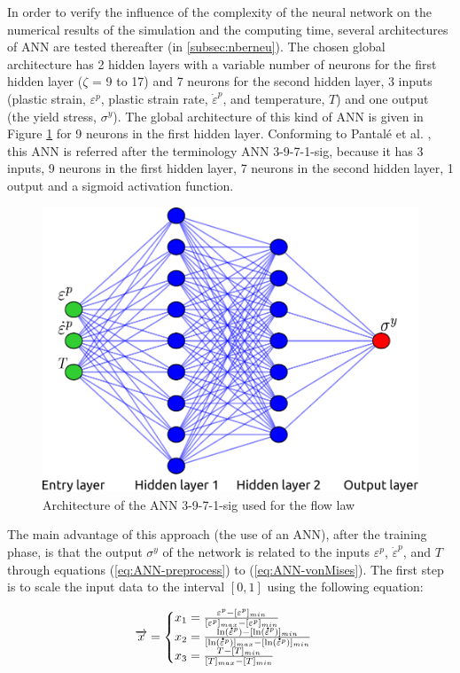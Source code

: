 \documentclass[final,5p,times,twocolumn]{elsarticle}
\newcommand{\mdot}[1]{\accentset{\mbox{\bfseries .}}{#1}}
\begin{document}
In order to verify the influence of the complexity of the neural network on the numerical results of the simulation and the computing time, several architectures of ANN are tested thereafter (in \ref{subsec:nberneu}). The chosen global architecture has 2 hidden layers with a variable number of neurons for the first hidden layer ($\zeta$ = 9 to 17) and 7 neurons for the second hidden layer, 3 inputs (plastic strain, $\varepsilon^p$, plastic strain rate, ${\dot{\varepsilon}}^p$, and temperature, $T$) and one output (the yield stress, $\sigma^y$). The global architecture of this kind of ANN is given in Figure \ref{ANN} for 9 neurons in the first hidden layer. Conforming to Pantalé et al. \cite{pantale_efficient_2022}, this ANN is referred after the terminology ANN 3-9-7-1-sig, because it has 3 inputs, 9 neurons in the first hidden layer, 7 neurons in the second hidden layer, 1 output and a sigmoid activation function.

\begin{figure}[h]
\centering
\includegraphics[width=0.8\columnwidth]{Figures/ANN}
\caption{Architecture of the ANN 3-9-7-1-sig used for the flow law}
\label{ANN}
\end{figure}

The main advantage of this approach (the use of an ANN), after the training phase, is that the output $\sigma^y$ of the network is related to the inputs $\varepsilon^p$, ${\dot{\varepsilon}}^p$, and $T$ through equations (\ref{eq:ANN-preprocess}) to (\ref{eq:ANN-vonMises}). The first step is to scale the input data to the interval $[0,1]$ using the following equation:

\begin{equation}
\overrightarrow{x} =
\begin{cases}
x_1 = \frac{\varepsilon^p - [\varepsilon^p]_{min}}{[\varepsilon^p]_{max} - [\varepsilon^p]_{min}}\\
x_2 = \frac{\ln(\mdot{\varepsilon}^p)-[\ln(\mdot{\varepsilon}^p)]_{min}}{[\ln(\mdot{\varepsilon}^p)]_{max}-[\ln(\mdot{\varepsilon}^p)]_{min}}\label{eq:ANN-preprocess}\\
x_3 = \frac{T-[T]_{min}}{[T]_{max}-[T]_{min}}
\end{cases}
\end{equation}
\end{document}
